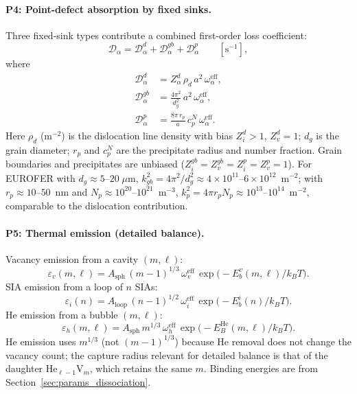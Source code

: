 \documentclass[pdflatex,sn-basic]{sn-jnl} %
\begin{document}
\paragraph{P4: Point-defect absorption by fixed sinks.}
Three fixed-sink types contribute a combined first-order loss coefficient:
\begin{equation}\label{eq:D_total}
    \mathcal{D}_\alpha
    = \mathcal{D}_\alpha^d + \mathcal{D}_\alpha^{gb}
    + \mathcal{D}_\alpha^p
    \qquad [\text{s}^{-1}],
\end{equation}
where
\begin{align}
    \mathcal{D}_\alpha^d
    &= Z_\alpha^d\,\rho_d\,a^2\,\omega_\alpha^{\mathrm{eff}},
    \label{eq:P4d}\\[2pt]
    \mathcal{D}_\alpha^{gb}
    &= \frac{4\pi^2}{d_g^2}\,a^2\,\omega_\alpha^{\mathrm{eff}},
    \label{eq:P4gb}\\[2pt]
    \mathcal{D}_\alpha^p
    &= \frac{8\pi\,r_p}{a}\,c_p^N\,\omega_\alpha^{\mathrm{eff}}.
    \label{eq:P4p}
\end{align}
Here $\rho_d$ (m$^{-2}$) is the dislocation line density with bias
$Z_i^d > 1$, $Z_v^d = 1$; $d_g$ is the grain diameter; $r_p$ and
$c_p^N$ are the precipitate radius and number fraction. Grain boundaries
and precipitates are unbiased ($Z_i^{gb} = Z_v^{gb} = Z_i^p = Z_v^p =
1$). For EUROFER with $d_g \approx 5$--$20\;\mu$m,
$k_{gb}^2 = 4\pi^2/d_g^2 \approx 4\times10^{11}$--$6\times10^{12}$~m$^{-2}$;
with $r_p \approx 10$--$50$~nm and $N_p \approx 10^{20}$--$10^{21}$~m$^{-3}$,
$k_p^2 = 4\pi r_p N_p \approx 10^{13}$--$10^{14}$~m$^{-2}$, comparable to
the dislocation contribution.

\paragraph{P5: Thermal emission (detailed balance).}
Vacancy emission from a cavity $(m,\ell)$:
\begin{equation}\label{eq:P5v}
    \varepsilon_v(m,\ell)
    = A_{\mathrm{sph}}\,(m{-}1)^{1/3}\,\omega_v^{\mathrm{eff}}\,
      \exp\!\bigl(-E_b^v(m,\ell)/k_BT\bigr).
\end{equation}
SIA emission from a loop of $n$ SIAs:
\begin{equation}\label{eq:P5i}
    \varepsilon_i(n)
    = A_{\mathrm{loop}}\,(n{-}1)^{1/2}\,\omega_i^{\mathrm{eff}}\,
      \exp\!\bigl(-E_b^i(n)/k_BT\bigr).
\end{equation}
He emission from a bubble $(m,\ell)$:
\begin{equation}\label{eq:P5h}
    \varepsilon_h(m,\ell)
    = A_{\mathrm{sph}}\,m^{1/3}\,\omega_h^{\mathrm{eff}}\,
      \exp\!\bigl(-E_B^{\mathrm{He}}(m,\ell)/k_BT\bigr).
\end{equation}
He emission uses $m^{1/3}$ (not $(m{-}1)^{1/3}$) because He removal
does not change the vacancy count; the capture radius relevant for
detailed balance is that of the daughter He$_{\ell-1}$V$_m$, which
retains the same $m$. Binding energies are from
Section~\ref{sec:params_dissociation}.
\end{document}
